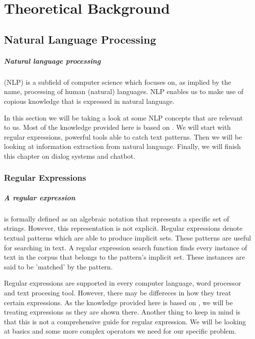 
\chapter{Theoretical Background}\label{chapter:theoretical_background}

\section{Natural Language Processing}
\paragraph{Natural language processing }(NLP) is a subfield of computer science which focuses on, as implied by the name, processing of human (natural) languages. NLP enables us to make use of copious knowledge that is expressed in natural language. \parencite{ai_nlp} 


In this section we will be taking a look at some NLP concepts that are relevant to us. 
Most of the knowledge provided here is based on \parencite{nlp}.
We will start with regular expressions, powerful tools able to catch text patterns. 
Then we will be looking at information extraction from natural language. 
Finally, we will finish this chapter on dialog systems and chatbot.

\subsection{Regular Expressions}
\paragraph{A regular expression}is formally defined as an algebraic notation that represents a specific set of strings.
However, this representation is not explicit. 
Regular expressions denote textual patterns which are able to produce implicit sets.
These patterns are useful for searching in text.
A regular expression search function finds every instance of text in the corpus that belongs to the pattern's implicit set.
These instances are said to be 'matched' by the pattern.

Regular expressions are supported in every computer language, word processor and text procesing tool. 
However, there may be differeces in how they treat certain expressions. 
As the knowledge provided here is based on \parencite{nlp_re}, we will be treating expressions as they are shown there.
Another thing to keep in mind is that this is not a comprehensive guide for regular expression. 
We will be looking at basics and some more complex operators we need for our specific problem. 

